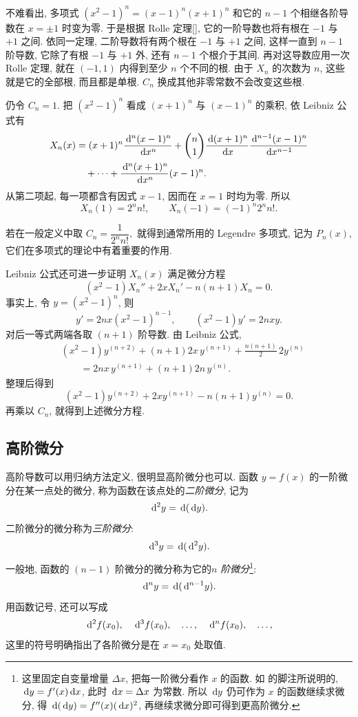 不难看出, 多项式 $(x^2 - 1)^n = (x-1)^n (x+1)^n$ 和它的 $n-1$ 个相继各阶导数在 $x=\pm1$ 时变为零.
于是根据 Rolle 定理[], 它的一阶导数也将有根在 $-1$ 与 $+1$ 之间.
依同一定理, 二阶导数将有两个根在 $-1$ 与 $+1$ 之间, 这样一直到 $n-1$ 阶导数, 它除了有根 $-1$ 与 $+1$ 外, 还有 $n-1$ 个根介于其间.
再对这导数应用一次 Rolle 定理, 就在 $(-1,1)$ 内得到至少 $n$ 个不同的根.
由于 $X_n$ 的次数为 $n$, 这些就是它的全部根, 而且都是单根.
$C_n$ 换成其他非零常数不会改变这些根.

仍令 $C_n=1$. 
把 $(x^2-1)^n$ 看成 $(x+1)^n$ 与 $(x-1)^n$ 的乘积, 依 Leibniz 公式有
$$
\begin{aligned}
X_n(x)
&=(x+1)^n\frac{\,\mathrm{d}^n(x-1)^n}{\,\mathrm{d} x^n}
+\binom{n}{1}\frac{\,\mathrm{d}(x+1)^n}{\,\mathrm{d} x}
\frac{\,\mathrm{d}^{n-1}(x-1)^n}{\,\mathrm{d} x^{n-1}}\\
&\quad+\cdots +\frac{\,\mathrm{d}^n(x+1)^n}{\,\mathrm{d} x^n}(x-1)^n.
\end{aligned}
$$
从第二项起, 每一项都含有因式 $x-1$, 因而在 $x=1$ 时均为零. 
所以
$$
X_n(1)=2^n n!,\qquad
X_n(-1)=(-1)^n2^n n!.
$$

若在一般定义中取
$
C_n=\dfrac{1}{2^n n!},
$
就得到通常所用的 Legendre 多项式, 记为 $P_n(x)$, 它们在多项式的理论中有着重要的作用.

Leibniz 公式还可进一步证明 $X_n(x)$ 满足微分方程
$$
(x^2-1)X_n''+2xX_n'-n(n+1)X_n=0.
$$
事实上, 令 $y=(x^2-1)^n$, 则
$$
y'=2nx(x^2-1)^{n-1},\qquad (x^2-1)y'=2nxy.
$$
对后一等式两端各取 $(n+1)$ 阶导数. 由 Leibniz 公式,
$$
\begin{aligned}
&(x^2-1)y^{(n+2)}+(n+1)2x\,y^{(n+1)}
+\frac{n(n+1)}{2}\,2y^{(n)} \\
&\qquad=2nx\,y^{(n+1)}+(n+1)2n\,y^{(n)}.
\end{aligned}
$$
整理后得到
$$
(x^2-1)y^{(n+2)}+2xy^{(n+1)}-n(n+1)y^{(n)}=0.
$$
再乘以 $C_n$, 就得到上述微分方程.

\subsection{高阶微分}\label{subsec:119}
高阶导数可以用归纳方法定义, 很明显高阶微分也可以.
函数 $y=f(x)$ 的一阶微分在某一点处的微分,
称为函数在该点处的\emph{二阶微分}, 记为
$$
\,\mathrm{d}^2y=\,\mathrm{d}(\,\mathrm{d} y).
$$
二阶微分的微分称为\emph{三阶微分}:
$$
\,\mathrm{d}^3y=\,\mathrm{d}(\,\mathrm{d}^2y).
$$
一般地, 函数的 $(n-1)$ 阶微分的微分称为它的\emph{$n$ 阶微分}\footnote{这里固定自变量增量 $\Delta x$, 把每一阶微分看作 $x$ 的函数.
如  的脚注所说明的, $\,\mathrm{d} y=f'(x)\,\mathrm{d} x$, 此时 $\,\mathrm{d} x=\Delta x$ 为常数.
所以 $\,\mathrm{d} y$ 仍可作为 $x$ 的函数继续求微分, 得
$\,\mathrm{d}(\,\mathrm{d} y)=f''(x)(\,\mathrm{d} x)^2$, 再继续求微分即可得到更高阶微分.}:
$$
\,\mathrm{d}^ny=\,\mathrm{d}(\,\mathrm{d}^{n-1}y).
$$
用函数记号, 还可以写成
$$
\,\mathrm{d}^2f(x_0),\quad\,\mathrm{d}^3f(x_0),\quad\ldots,\quad\,\mathrm{d}^nf(x_0),\quad\ldots,
$$
这里的符号明确指出了各阶微分是在 $x=x_0$ 处取值.

